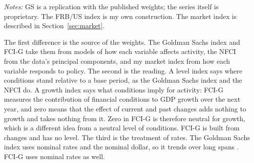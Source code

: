 \documentclass[11pt]{article}
\begin{document}
\begin{table}[tp]\centering\small
\caption{The Indexes}\label{tab:existing}
\begin{flushleft}\footnotesize\textit{Notes:} GS is a replication with the published weights; the series itself is proprietary. The FRB/US index is my own construction. The market index is described in Section~\ref{sec:market}.\end{flushleft}
\end{table}

The first difference is the source of the weights. The Goldman Sachs index and FCI-G take them from models of how each variable affects activity, the NFCI from the data's principal components, and my market index from how each variable responds to policy. The second is the reading. A level index says where conditions stand relative to a base period, as the Goldman Sachs index and the NFCI do. A growth index says what conditions imply for activity: FCI-G measures the contribution of financial conditions to GDP growth over the next year, and zero means that the effect of current and past changes adds nothing to growth and takes nothing from it. Zero in FCI-G is therefore neutral for growth, which is a different idea from a neutral level of conditions. FCI-G is built from changes and has no level. The third is the treatment of rates. The Goldman Sachs index uses nominal rates and the nominal dollar, so it trends over long spans \citep{hatzius2010}. FCI-G uses nominal rates as well.
\end{document}
